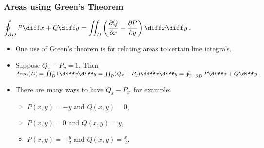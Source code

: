 \begin{frame}
\frametitle{Areas using Green's Theorem}
\begin{theorem}[Green]
$\displaystyle\oint_{\partial D} P \diff x + Q \diff y = \iint_D \left( \frac{ \partial Q}{\partial x} - \frac{ \partial P}{ \partial y} \right) \diff x \diff y \; .$
\end{theorem}
  
\begin{itemize}
\item One use of Green's theorem is for relating areas to certain line integrals.
\item Suppose $Q_x-P_y =1$. Then
$
\text{Area}(D)  = \iint_D 1 \diff x \diff y = \iint_D (Q_x - P_y) \diff x \diff y 
 = \oint_{C=\partial D} P\diff x + Q\diff y\; .
$
\item There are many ways to have $Q_x-P_y$, for example:
\begin{itemize}
\item $P(x,y) = -y$ and $Q(x,y) = 0$,
\item $P(x,y) = 0$ and $Q(x,y) = y$,
\item $P(x,y) = -\frac{y}{2}$ and $Q(x,y) = \frac{x}{2}$.
\end{itemize}
\end{itemize}
\end{frame}



